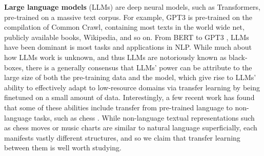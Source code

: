 \documentclass[letterpaper]{article} %
\begin{document}
\textbf{Large language models} (LLMs) are deep neural models, such as Transformers, pre-trained on a massive text corpus. For example, GPT3 is pre-trained on the compilation of Common Crawl, containing most texts in the world wide net, publicly available books, Wikipedia, and so on. From BERT \cite{devlin-etal-2019-bert} to GPT3 \cite{NEURIPS2020_1457c0d6}, LLMs have been dominant is most tasks and applications in NLP. While much about how LLMs work is unknown, and thus LLMs are notoriously known as black-boxes, there is a generally consensus that LLMs' power can be attribute to the large size of both the pre-training data and the model, which give rise to LLMs' ability to effectively adapt to low-resource domains via transfer learning by being finetuned on a small amount of data. Interestingly, a few recent work has found that some of these abilities include transfer from pre-trained language to non-language tasks, such as chess \cite{stockl-2021-watching}. While non-language textual representations such as chess moves or music charts are similar to natural language superficially, each manifests vastly different structures, and so we claim that transfer learning between them is well worth studying.

\vspace{-0.75mm}
\end{document}
